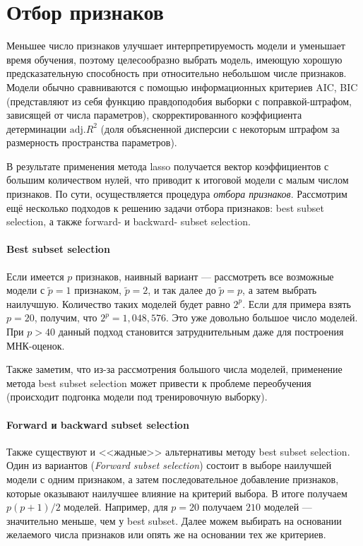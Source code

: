 \documentclass[12pt,a4paper,final]{article}
\newcommand{\1}{\mathds{1}}
\begin{document}
\section{Отбор признаков}
 
Меньшее число признаков улучшает интерпретируемость модели и уменьшает время обучения, поэтому целесообразно выбрать модель, имеющую хорошую предсказательную способность при относительно небольшом числе признаков. 
Модели обычно сравниваются с помощью информационных критериев AIC, BIC (представляют из себя функцию правдоподобия выборки с поправкой-штрафом, зависящей от числа параметров), скорректированного коэффициента детерминации $\text{adj.}R^2$ (доля объясненной дисперсии с некоторым штрафом за размерность пространства параметров).

В результате применения метода lasso получается вектор коэффициентов с большим количеством нулей, что приводит к итоговой модели с малым числом признаков. По сути, осуществляется процедура \textit{отбора признаков}.  
Рассмотрим ещё несколько подходов к решению задачи отбора признаков: best subset selection, а также forward- и backward- subset selection.

\paragraph{Best subset selection}

Если имеется $p$ признаков, наивный вариант --- рассмотреть все возможные модели с $\tilde p = 1$ признаком, $\tilde p = 2$, и так далее до $\tilde p = p$, а затем выбрать наилучшую. Количество таких моделей будет равно $2^p$. Если для примера взять $p = 20$, получим, что $2^p = 1,048,576$. Это уже довольно большое число моделей. При $p > 40$ данный подход становится затруднительным даже для построения МНК-оценок.

Также заметим, что из-за рассмотрения большого числа моделей, применение метода best subset selection может привести к проблеме переобучения (происходит подгонка модели под тренировочную выборку).

\paragraph{Forward и backward subset selection}

Также существуют и <<жадные>> альтернативы методу best subset selection. Один из вариантов (\textit{Forward subset selection}) состоит в выборе наилучшей модели с одним признаком, а затем последовательное добавление признаков, которые оказывают наилучшее влияние на критерий выбора. В итоге получаем $p(p+1)/2$ моделей. Например, для $p = 20$ получаем $210$ моделей --- значительно меньше, чем у best subset. Далее можем выбирать на основании желаемого числа признаков или опять же на основании тех же критериев. 
\end{document}
